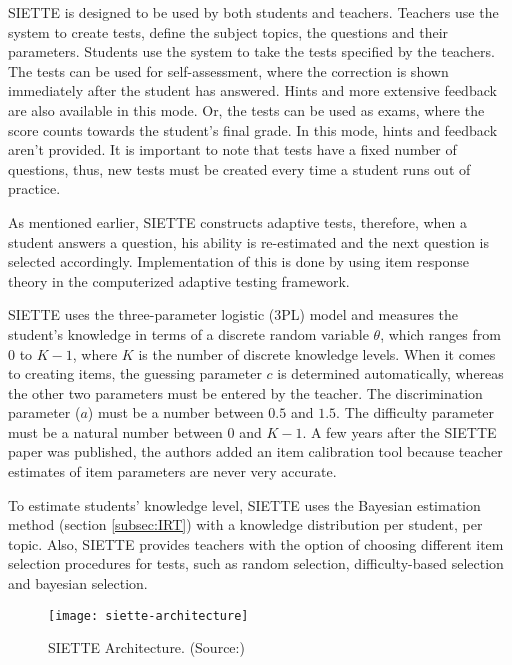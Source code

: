 SIETTE is designed to be used by both students and teachers. Teachers use the system to create tests, define the subject topics, the questions and their parameters. Students use the system to take the tests specified by the teachers. The tests can be used for self-assessment, where the correction is shown immediately after the student has answered. Hints and more extensive feedback are also available in this mode. Or, the tests can be used as exams, where the score counts towards the student's final grade. In this mode, hints and feedback aren't provided. It is important to note that tests have a fixed number of questions, thus, new tests must be created every time a student runs out of practice.\newline

As mentioned earlier, SIETTE constructs adaptive tests, therefore, when a student answers a question, his ability is re-estimated and the next question is selected accordingly. Implementation of this is done by using item response theory in the computerized adaptive testing framework.\newline

SIETTE uses the three-parameter logistic (3PL) model and measures the student's knowledge in terms of a discrete random variable $\theta$, which ranges from 0 to $K-1$, where $K$ is the number of discrete knowledge levels. When it comes to creating items, the guessing parameter $c$ is determined automatically, whereas the other two parameters must be entered by the teacher. The discrimination parameter ($a$) must be a number between $0.5$ and $1.5$. The difficulty parameter must be a natural number between 0 and $K-1$. A few years after the SIETTE paper was published, the authors added an item calibration tool because teacher estimates of item parameters are never very accurate.\newline

To estimate students' knowledge level, SIETTE uses the Bayesian estimation method (section \ref{subsec:IRT}) with a knowledge distribution per student, per topic. Also, SIETTE provides teachers with the option of choosing different item selection procedures for tests, such as random selection, difficulty-based selection and bayesian selection.

\begin{figure}[H]
\centering
\texttt{[image: siette-architecture]}
\caption{SIETTE Architecture. (Source:\cite{SIETTE})}
\label{fig:siette-architecture}
\end{figure}

